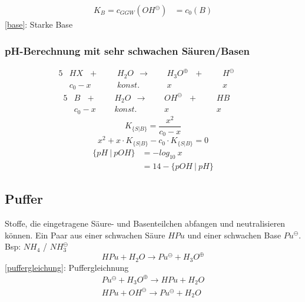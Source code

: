 {\large
	\begin{equation}
	\label{base}
	\begin{split}
	K_B=c_{GGW}(OH^\ominus) &= c_0(B)
	\end{split}
	\end{equation}	
}
\ref{base}: Starke Base
\subsubsection{pH-Berechnung mit sehr schwachen Säuren/Basen}

\begin{alignat*}{5}
	&HX \ \ \ +\ \ \ &&H_2O\ \ \rightarrow \ \ &&H_3O^\oplus \ \ \ +\ \ \ &&H^\ominus && \\
	&c_0 - x && konst. && x && x &&
\end{alignat*}
\begin{alignat*}{5}
	&B \ \ \ +\ \ \ &&H_2O\ \ \rightarrow \ \ &&OH^\ominus \ \ \ +\ \ \ &&HB && \\
	&c_0 - x && konst. && x && x &&
\end{alignat*}
{\large
	\begin{equation}
		K_{\{S|B\}} = \frac{x^2}{c_0-x}
	\end{equation}	
}
{\large
	\begin{equation}
	x^2 + x\cdot K_{\{S|B\}} - c_0 \cdot K_{\{S|B\}} = 0
	\end{equation}
}
{\large
	\begin{equation}
	\begin{split}
		\{pH\ |\ pOH\}&=-log_{10}\ x \\
		&=14-\{pOH\  |\  pH\}
	\end{split}
	\end{equation}
}
\subsection{Puffer}
Stoffe, die eingetragene Säure- und Basenteilchen abfangen und neutralisieren können.
Ein Paar aus einer schwachen Säure $HPu$ und einer schwachen Base $Pu^\ominus$. Bsp: $NH_4$ / $NH_3^\ominus$
{\large
\begin{equation}
	\label{puffergleichung}
	HPu + H_2O \rightarrow Pu^\ominus + H_3O^\oplus	
\end{equation}
}
\ref{puffergleichung}: Puffergleichnung
{\large
	\begin{equation}
	\label{pufferausgleich}
	\begin{split}
	Pu^\ominus + H_3O^\oplus \rightarrow HPu + H_2O \\
	HPu + OH^\ominus \rightarrow Pu^\ominus + H_2O
	\end{split}
	\end{equation}
}

